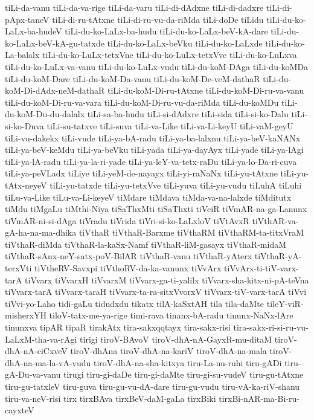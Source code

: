 {tiLi-da-vanu
tiLi-da-va-rige
tiLi-da-varu
tiLi-di-dAdxne
tiLi-di-dadxre
tiLi-di-pApx-taneV
tiLi-di-ru-tAtxne
tiLi-di-ru-vu-da-riMda
tiLi-doDe
tiLidu
tiLi-du-ko-LaLx-ba-hudeV
tiLi-du-ko-LaLx-ba-hudu
tiLi-du-ko-LaLx-beV-kA-dare
tiLi-du-ko-LaLx-beV-kA-gu-tatxde
tiLi-du-ko-LaLx-beVku
tiLi-du-ko-LaLxde
tiLi-du-ko-La-balalx
tiLi-du-ko-LuLx-tetxVne
tiLi-du-ko-LuLx-tetxVve
tiLi-du-ko-LuLxva
tiLi-du-ko-LuLx-va-vanu
tiLi-du-ko-LuLx-vudu
tiLi-du-koM-DAga
tiLi-du-koMDa
tiLi-du-koM-Dare
tiLi-du-koM-Da-vanu
tiLi-du-koM-De-veM-dathaR
tiLi-du-koM-Di-dAdx-neM-dathaR
tiLi-du-koM-Di-ru-tAtxne
tiLi-du-koM-Di-ru-va-vanu
tiLi-du-koM-Di-ru-va-vara
tiLi-du-koM-Di-ru-vu-da-riMda
tiLi-du-koMDu
tiLi-du-koM-Du-du-dalalx
tiLi-sa-ba-hudu
tiLi-si-dAdxre
tiLi-sida
tiLi-si-ko-Dalu
tiLi-si-ko-Duva
tiLi-su-tatxve
tiLi-suva
tiLi-va-Like
tiLi-va-Li-keyU
tiLi-vaM-geyU
tiLi-vu-dakekx
tiLi-vude
tiLi-ya-bA-radu
tiLi-ya-ba-lalxnu
tiLi-ya-beV-kaNANx
tiLi-ya-beV-keMdu
tiLi-ya-beVku
tiLi-yada
tiLi-ya-dayAyx
tiLi-yade
tiLi-ya-lAgi
tiLi-ya-lA-radu
tiLi-ya-la-ri-yade
tiLi-ya-leY-va-tetx-raDu
tiLi-ya-lo-Da-ri-cuva
tiLi-ya-peVLadx
tiLiye
tiLi-yeM-de-nayayx
tiLi-yi-raNaNx
tiLi-yu-tAtxne
tiLi-yu-tAtx-neyeV
tiLi-yu-tatxde
tiLi-yu-tetxVve
tiLi-yuva
tiLi-yu-vudu
tiLuhA
tiLuhi
tiLu-va-Like
tiLu-va-Li-keyeV
tiMdare
tiMdava
tiMda-va-na-lalxde
tiMditutx
tiMdu
tiMgaLu
tiMthi-Niya
tiSaThxMti
tiSaThxti
tiVciR
tiVmAR-na-ga-Lanunx
tiVmAR-ni-si-dAga
tiVradu
tiVrida
tiVri-si-ko-LaLxloV
tiVtAvxR
tiVthAR-va-gA-ha-na-ma-dhika
tiVthaR
tiVthaR-Barxme
tiVthaRM
tiVthaRM-ta-titxVraM
tiVthaR-diMda
tiVthaR-la-kaSx-Namf
tiVthaR-liM-gasayx
tiVthaR-midaM
tiVthaR-sAnx-neY-satx-poV-BilAR
tiVthaR-vanu
tiVthaR-yAterx
tiVthaR-yA-terxVti
tiVtheRV-Savxpi
tiVthoRV-da-ka-vanunx
tiVvArx
tiVvArx-ti-tiV-varx-tarA
tiVvarx
tiVvarxH
tiVvarxM
tiVvarx-ga-ti-yalilx
tiVvarx-sha-kitx-ni-pA-teVna
tiVvarx-tarA
tiVvarx-taraH
tiVvarx-ta-ra-sitxVvorxV
tiVvarx-tiV-varx-tarA
tiVvi
tiVvi-yo-Laho
tidi-gaLu
tidudxdu
tikatx
tilA-kaSxtAH
tila
tila-daMte
tileY-viR-misherxYH
tiloV-tatx-me-ya-rige
timi-rava
tinanx-bA-radu
tinunx-NaNx-lAre
tinunxva
tipAR
tipaR
tirakAtx
tira-sakxqqtayx
tira-sakx-risi
tira-sakx-ri-si-ru-vu-LaLxM-tha-va-rAgi
tirigi
tiroV-BAvoV
tiroV-dhA-nA-GayxR-mu-ditaM
tiroV-dhA-nA-ciCxveV
tiroV-dhAna
tiroV-dhA-na-kariV
tiroV-dhA-na-mala
tiroV-dhA-na-ma-la-vA-vudu
tiroV-dhA-na-sha-kitxya
tiru-La-nu-ruhi
tiru-gADi
tiru-gA-Du-va-vanu
tirugi
tiru-gi-daDe
tiru-gi-daMte
tiru-gi-su-vudeV
tiru-gu-tAtxne
tiru-gu-tatxleV
tiru-guva
tiru-gu-vu-dA-dare
tiru-gu-vudu
tiru-vA-ka-riV-shanu
tiru-va-neV-risi
tirx
tirxBAva
tirxBeV-daM-gaLa
tirxBiki
tirxBi-nAR-ma-Bi-ru-cayxteV
}
